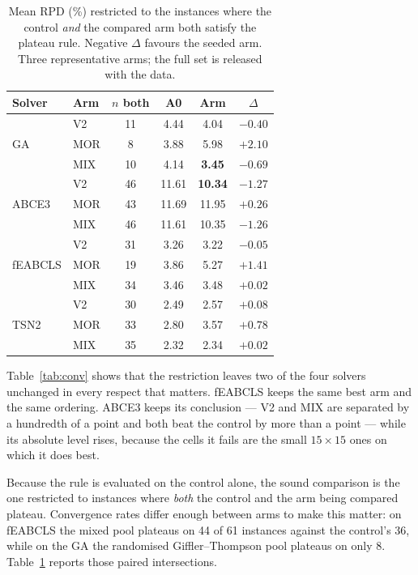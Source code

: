\documentclass[review]{elsarticle}
\begin{document}
\begin{table}[htbp]
\centering
\caption{Mean RPD (\%) restricted to the instances where the control
\emph{and} the compared arm both satisfy the plateau rule. Negative
$\Delta$ favours the seeded arm. Three representative arms; the full set is
released with the data.}
\label{tab:inter}
\small
\begin{tabular}{llcccc}
\toprule
Solver & Arm & $n$ both & A0 & Arm & $\Delta$ \\
\midrule
\multirow{3}{*}{GA}
 & V2  & 11 & 4.44 & 4.04 & $-0.40$ \\
 & MOR & 8  & 3.88 & 5.98 & $+2.10$ \\
 & MIX & 10 & 4.14 & \textbf{3.45} & $\mathbf{-0.69}$ \\
\midrule
\multirow{3}{*}{ABCE3}
 & V2  & 46 & 11.61 & \textbf{10.34} & $\mathbf{-1.27}$ \\
 & MOR & 43 & 11.69 & 11.95 & $+0.26$ \\
 & MIX & 46 & 11.61 & 10.35 & $-1.26$ \\
\midrule
\multirow{3}{*}{fEABCLS}
 & V2  & 31 & 3.26 & 3.22 & $\mathbf{-0.05}$ \\
 & MOR & 19 & 3.86 & 5.27 & $+1.41$ \\
 & MIX & 34 & 3.46 & 3.48 & $+0.02$ \\
\midrule
\multirow{3}{*}{TSN2}
 & V2  & 30 & 2.49 & 2.57 & $+0.08$ \\
 & MOR & 33 & 2.80 & 3.57 & $+0.78$ \\
 & MIX & 35 & 2.32 & 2.34 & $+0.02$ \\
\bottomrule
\end{tabular}
\end{table}

Table~\ref{tab:conv} shows that the restriction leaves two of the four
solvers unchanged in every respect that matters. fEABCLS keeps the same
best arm and the same ordering. ABCE3 keeps its conclusion --- V2 and MIX
are separated by a hundredth of a point and both beat the control by more
than a point --- while its absolute level rises, because the cells it fails
are the small $15\times15$ ones on which it does best.

Because the rule is evaluated on the control alone, the sound comparison is
the one restricted to instances where \emph{both} the control and the arm
being compared plateau. Convergence rates differ enough between arms to
make this matter: on fEABCLS the mixed pool plateaus on 44 of 61 instances
against the control's 36, while on the GA the randomised
Giffler--Thompson pool plateaus on only 8. Table~\ref{tab:inter} reports
those paired intersections.
\end{document}
